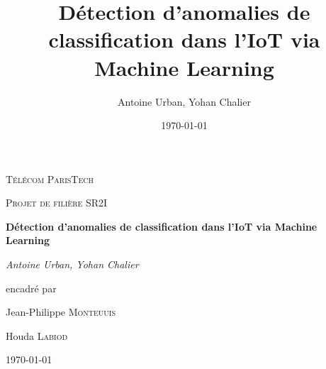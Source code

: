 \documentclass[a4paper]{report}
\title{Détection d'anomalies de classification dans l'IoT via Machine Learning}
\author{Antoine Urban, Yohan Chalier}
\date{\today}
\begin{document}
\begin{titlepage}
	\centering
	\vspace{1cm}
	{\scshape\LARGE Télécom ParisTech \par}
	\vspace{1cm}
	{\scshape\Large Projet de filière SR2I \par}
	\vspace{1.5cm}
	{\huge\bfseries Détection d'anomalies de classification dans l'IoT via Machine Learning\par}
	\vspace{2cm}
	{\Large\itshape Antoine Urban, Yohan Chalier \par}
	\vfill
	encadré par\par
	Jean-Philippe \textsc{Monteuuis}\par
	Houda \textsc{Labiod}
	\vfill

	{\large \today\par}
\end{titlepage}



\begin{abstract}
\end{abstract}



\begin{thebibliography}{9}
\end{thebibliography}
\end{document}
